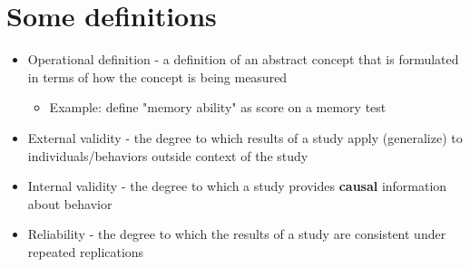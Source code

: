 \documentclass[11pt]{article}
\begin{document}
\section*{Some definitions}
\label{sec-2}
\begin{itemize}
\item Operational definition - a definition of an abstract concept that is formulated in terms of how the concept is being measured
\begin{itemize}
\item Example: define "memory ability" as score on a memory test
\end{itemize}
\item External validity - the degree to which results of a study apply (generalize) to individuals/behaviors outside context of the study
\item Internal validity - the degree to which a study provides \textbf{causal} information about behavior
\item Reliability - the degree to which the results of a study are consistent under repeated replications
\end{itemize}
\end{document}
